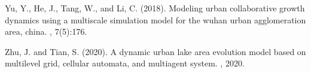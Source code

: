 \documentclass[11pt]{article}
\begin{document}
\begin{thebibliography}{}
Yu, Y., He, J., Tang, W., and Li, C. (2018).
\newblock Modeling urban collaborative growth dynamics using a multiscale
  simulation model for the wuhan urban agglomeration area, china.
, 7(5):176.

Zhu, J. and Tian, S. (2020).
\newblock A dynamic urban lake area evolution model based on multilevel grid,
  cellular automata, and multiagent system.
, 2020.

\end{thebibliography}
\end{document}
